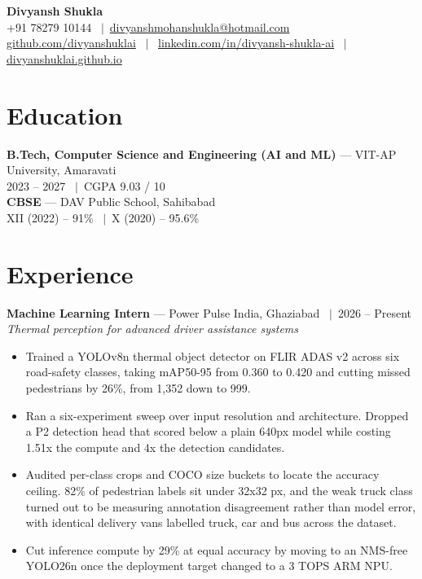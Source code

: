 \documentclass[a4paper,9pt]{extarticle}
\newcommand{\sep}{\ $\vert$\ }
\begin{document}
\begin{center}
{\LARGE \textbf{Divyansh Shukla}}\\[3pt]
+91 78279 10144 \sep \href{mailto:divyanshmohanshukla@hotmail.com}{divyanshmohanshukla@hotmail.com}\\[2pt]
\href{https://github.com/divyanshuklai}{github.com/divyanshuklai} \sep
\href{https://linkedin.com/in/divyansh-shukla-ai}{linkedin.com/in/divyansh-shukla-ai} \sep
\href{https://divyanshuklai.github.io}{divyanshuklai.github.io}
\end{center}

\section*{Education}
\textbf{B.Tech, Computer Science and Engineering (AI and ML)} --- VIT-AP University, Amaravati\\
2023 -- 2027 \sep CGPA 9.03 / 10\\[3pt]
\textbf{CBSE} --- DAV Public School, Sahibabad\\
XII (2022) -- 91\% \sep X (2020) -- 95.6\%

\section*{Experience}
\textbf{Machine Learning Intern} --- Power Pulse India, Ghaziabad \sep 2026 -- Present\\
\textit{Thermal perception for advanced driver assistance systems}
\begin{itemize}
  \item Trained a YOLOv8n thermal object detector on FLIR ADAS v2 across six road-safety classes, taking mAP50-95 from 0.360 to 0.420 and cutting missed pedestrians by 26\%, from 1,352 down to 999.
  \item Ran a six-experiment sweep over input resolution and architecture. Dropped a P2 detection head that scored below a plain 640px model while costing 1.51x the compute and 4x the detection candidates.
  \item Audited per-class crops and COCO size buckets to locate the accuracy ceiling. 82\% of pedestrian labels sit under 32x32 px, and the weak truck class turned out to be measuring annotation disagreement rather than model error, with identical delivery vans labelled truck, car and bus across the dataset.
  \item Cut inference compute by 29\% at equal accuracy by moving to an NMS-free YOLO26n once the deployment target changed to a 3 TOPS ARM NPU.
\end{itemize}
\end{document}
